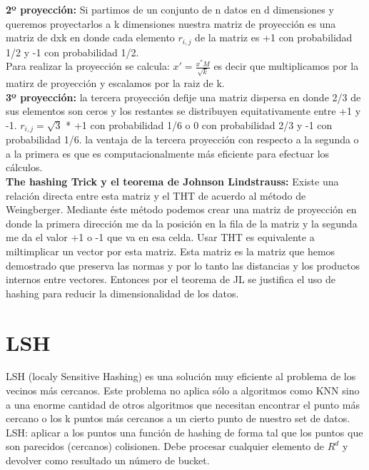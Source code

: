 \documentclass[titlepage,a4paper]{article}
\begin{document}
\textbf{2º proyección:} Si partimos de un conjunto de n datos en d dimensiones y queremos proyectarlos a k dimensiones nuestra matriz de proyección es una matriz de dxk en donde cada elemento $r_{i,j}$ de la matriz es +1 con probabilidad 1/2 y -1 con probabilidad 1/2.  \\

Para realizar la proyección se calcula: $ x' = \frac{x^*M}{\sqrt{k}} $ es decir que multiplicamos  por la matirz de proyección y escalamos por la raiz de k. \\

\textbf{3º proyección:} la tercera proyección defije una matriz dispersa en donde 2/3  de sus elementos son ceros y los restantes se distribuyen equitativamente entre +1 y -1. $r_{i,j} = \sqrt{3}$ * +1 con probabilidad 1/6 o 0 con probabilidad 2/3 y -1 con probabilidad 1/6. la ventaja de la tercera proyección con respecto a la segunda o a la primera es que es computacionalmente más eficiente para efectuar los cálculos. \\

\textbf{The hashing Trick y el teorema de Johnson Lindstrauss: } Existe una relación directa entre esta matriz y el THT de acuerdo al método de Weingberger. Mediante éste método podemos crear una matriz de proyección en donde la primera dirección me da la posición en la fila de la matriz y la segunda me da el valor +1 o -1 que va en esa celda. Usar THT es equivalente a miltimplicar un vector por esta matriz.  Esta matriz es la matriz que hemos demostrado que preserva las normas y por lo tanto las distancias y los productos internos entre vectores. Entonces por el teorema de JL se justifica el uso de hashing para reducir la dimensionalidad de los datos. \\



\section*{LSH}
LSH (localy Sensitive Hashing) es una solución muy eficiente al problema de los vecinos más cercanos. Este problema no aplica sólo a algoritmos como KNN sino a una enorme cantidad de otros algoritmos que necesitan encontrar el punto más cercano o los k puntos más cercanos a un cierto punto de nuestro set de datos. \\

LSH: aplicar a los puntos una función de hashing de forma tal que los puntos que son parecidos (cercanos) colisionen. Debe procesar cualquier elemento de $R^d$  y devolver como resultado un número de bucket. \\
\end{document}
